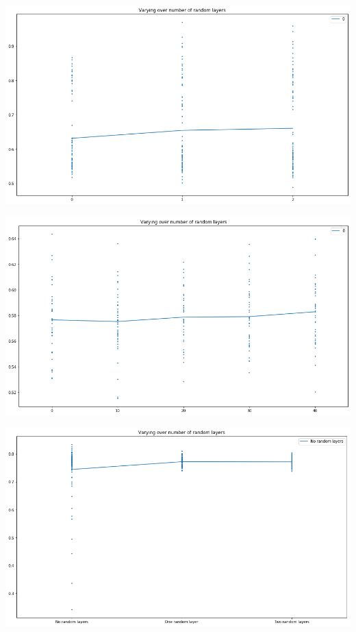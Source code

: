 \documentclass[]{article}
\newenvironment{Figure}
{\par\medskip\noindent\minipage{\linewidth}}
{\endminipage\par\medskip}
\begin{document}
\begin{multicols}{2}
	\begin{Figure}
		\centering
		\includegraphics[width=\linewidth]{figure2.png}
		\label{fig:result2}
	\end{Figure}
	
	\begin{Figure}
		\centering
		\includegraphics[width=\linewidth]{figure3.png}
		\label{fig:result3}
	\end{Figure}
	
	\begin{Figure}
		\centering
		\includegraphics[width=\linewidth]{figure4.png}
		\label{fig:result4}
	\end{Figure}
	

\end{multicols}
\end{document}
